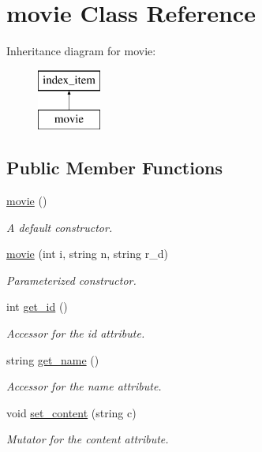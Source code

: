 \hypertarget{classmovie}{}\section{movie Class Reference}
\label{classmovie}
Inheritance diagram for movie\+:\begin{figure}[H]
\begin{center}
\leavevmode
\includegraphics[height=2.000000cm]{classmovie}
\end{center}
\end{figure}
\subsection*{Public Member Functions}
\begin{DoxyCompactItemize}
\item 
\mbox{\label{classmovie_a52149171d891855e3604cf875be972de}} 
\hyperlink{classmovie_a52149171d891855e3604cf875be972de}{movie} ()
\begin{DoxyCompactList}\small\item\em A default constructor. \end{DoxyCompactList}\item 
\hyperlink{classmovie_ade4123fe79e3f4d7705afb846e81f04b}{movie} (int i, string n, string r\+\_\+d)
\begin{DoxyCompactList}\small\item\em Parameterized constructor. \end{DoxyCompactList}\item 
int \hyperlink{classmovie_ae9b737d098d15f4732b912ad85e4d21b}{get\+\_\+id} ()
\begin{DoxyCompactList}\small\item\em Accessor for the id attribute. \end{DoxyCompactList}\item 
string \hyperlink{classmovie_acf7b3b85ac5cff85c7cc878cb42a6a4b}{get\+\_\+name} ()
\begin{DoxyCompactList}\small\item\em Accessor for the name attribute. \end{DoxyCompactList}\item 
void \hyperlink{classmovie_a8e27df5de3f14e52e125240a913dbbde}{set\+\_\+content} (string c)
\begin{DoxyCompactList}\small\item\em Mutator for the content attribute. \end{DoxyCompactList}\end{DoxyCompactItemize}
